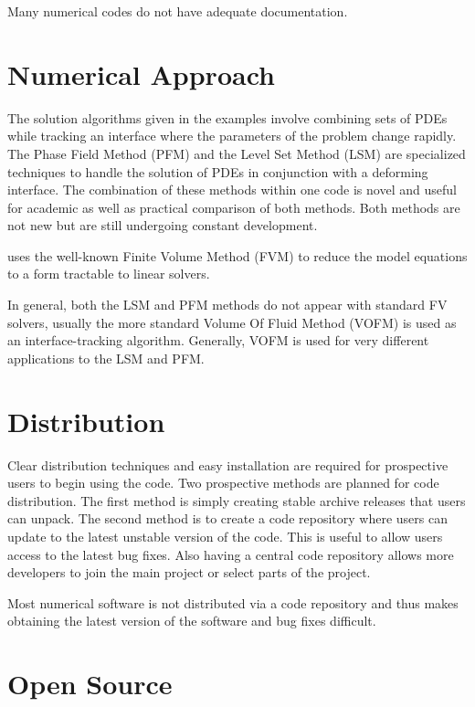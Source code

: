 Many numerical codes do not have adequate documentation.

\section{Numerical Approach}

The solution algorithms given in the \FiPy{} examples involve combining
sets of PDEs while tracking an interface where the parameters of the
problem change rapidly. The Phase Field Method (PFM) and the Level Set
Method (LSM) are specialized techniques to handle the solution of
PDEs in conjunction with a deforming interface. The combination of
these methods within one code is novel and useful for academic as well
as practical comparison of both methods. Both methods are not new but
are still undergoing constant development.

\FiPy{} uses the well-known Finite Volume Method (FVM) to reduce the
model equations to a form tractable to linear solvers.

In general, both the LSM and PFM methods do not appear with standard
FV solvers, usually the more standard Volume Of Fluid Method (VOFM) is
used as an interface-tracking algorithm. Generally, VOFM is used for
very different applications to the LSM and PFM.

\section{Distribution}

Clear distribution techniques and easy installation are required for
prospective users to begin using the code. Two prospective methods are
planned for code distribution. The first method is simply creating
stable archive releases that users can unpack. The second method is to
create a code repository where users can update to the latest unstable
version of the code. This is useful to allow users access to the
latest bug fixes. Also having a central code repository allows more
developers to join the main project or select parts of the project.

Most numerical software is not distributed via a code repository and
thus makes obtaining the latest version of the software and bug fixes
difficult.

\section{Open Source}

